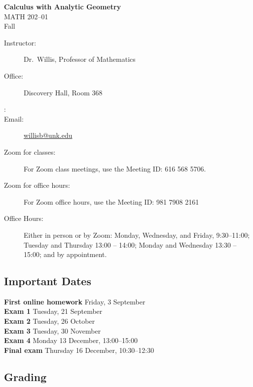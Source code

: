 \documentclass[12pt]{article}
\newcounter{ex}\setcounter{ex}{0}
\newenvironment{mypar}[2]
  {\begin{list}{}%
    {\setlength\leftmargin{#1}
    \setlength\rightmargin{#2}}
    \item[]}
  {\end{list}}
\newcommand{\term}{Fall }
\newcommand{\RomanNumeralCaps}[1]
      {\MakeUppercase{\romannumeral #1}}
\newcommand{\coursename}{Calculus \RomanNumeralCaps{2} with Analytic Geometry}
\newcommand{\coursenumber}{MATH 202}
\newcommand{\sectionnumber}{01}
\begin{document}
\large
\begin{center}
    \textbf{\coursename}  \\
    {\coursenumber--\sectionnumber} \\
     {\term \the\year} \\
\end{center}

\vskip0.25in
\normalsize


\begin{center}
\begin{description}
    \item[Instructor:] Dr.\  Willis, Professor of Mathematics
    \item[Office:]  Discovery Hall, Room 368
    \item[\phone:]  
    \item[Email:] \href{mailto:willisb@unk.edu}{willisb@unk.edu}
    \item[Zoom for classes:] For Zoom class meetings, use the Meeting ID: 616 568 5706. 
    \item[Zoom for office hours:] For Zoom office hours, use the Meeting ID: 981 7908 2161 
    \item[Office Hours:] Either in person or by Zoom: Monday, Wednesday, and  Friday, \mbox{9:30--11:00}; Tuesday and Thursday 13:00 -- 14:00; Monday and Wednesday 13:30 -- 15:00;  and by appointment.
  \end{description}
\end{center}


\subsection*{Important Dates}

\begin{mypar}{0.25in}{0.25in}
    \textbf{First online homework} \dotfill Friday, 3 September \\
    \textbf{Exam 1} \dotfill Tuesday, 21 September \\
    \textbf{Exam 2} \dotfill Tuesday, 26 October \\
    \textbf{Exam 3} \dotfill Tuesday, 30 November \\
    \textbf{Exam 4} \dotfill Monday 13 December, 13:00--15:00 \\
    \textbf{Final exam} \dotfill Thursday 16 December, 10:30--12:30\\
\end{mypar}

\subsection*{Grading}
\end{document}
